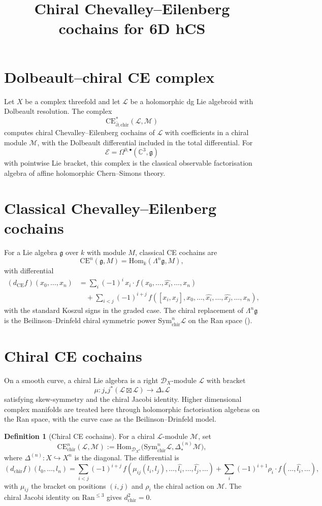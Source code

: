 \documentclass[11pt]{amsart}
\title{Chiral Chevalley--Eilenberg cochains for 6D hCS}
\author{}
\date{}
\providecommand{\C}{\mathbb{C}}
\providecommand{\dbar}{\bar{\partial}}
\providecommand{\g}{\mathfrak{g}}
\providecommand{\Sym}{\mathrm{Sym}}
\providecommand{\CE}{\mathrm{CE}}
\providecommand{\chir}{\mathrm{chir}}
\providecommand{\Ran}{\mathrm{Ran}}
\providecommand{\Hom}{\mathrm{Hom}}
\providecommand{\cL}{\mathcal{L}}
\providecommand{\cM}{\mathcal{M}}
\providecommand{\cE}{\mathcal{E}}
\providecommand{\cD}{\mathcal{D}}
\theoremstyle{plain}
\theoremstyle{definition}
\newtheorem{definition}[theorem]{Definition}
\theoremstyle{remark}
\begin{document}
\maketitle

\section{Dolbeault--chiral CE complex}
Let $X$ be a complex threefold and let $\cL$ be a holomorphic dg Lie
algebroid with Dolbeault resolution. The complex
\[
  \CE^*_{\dbar,\chir}(\cL,\cM)
\]
computes chiral Chevalley--Eilenberg cochains of $\cL$ with coefficients
in a chiral module $\cM$, with the Dolbeault differential included in
the total differential. For
\[
  \cE=\Omega^{0,\bullet}(\C^3,\g)
\]
with pointwise Lie bracket, this complex is the classical observable
factorisation algebra of affine holomorphic Chern--Simons theory.

\section{Classical Chevalley--Eilenberg cochains}
For a Lie algebra $\g$ over $k$ with module $M$, classical CE cochains are
\[
 \CE^n(\g,M)=\Hom_k(\Lambda^n\g,M),
\]
with differential
\[
\begin{aligned}
 (d_{\CE}f)(x_0,\ldots,x_n)
 &=
 \sum_i(-1)^i\,x_i\cdot
 f(x_0,\ldots,\widehat{x_i},\ldots,x_n) \\
 &\quad+
 \sum_{i<j}(-1)^{i+j}\,
 f([x_i,x_j],x_0,\ldots,\widehat{x_i},\ldots,\widehat{x_j},\ldots,x_n),
\end{aligned}
\]
with the standard Koszul signs in the graded case. The chiral
replacement of $\Lambda^n\g$ is the Beilinson--Drinfeld chiral
symmetric power $\Sym^n_{\chir}\cL$ on the Ran space
(\cite[\S3.4]{BD04}).

\section{Chiral CE cochains}
On a smooth curve, a chiral Lie algebra is a right $\cD_X$-module
$\cL$ with bracket
\[
  \mu:j_*j^*(\cL\boxtimes\cL)\longrightarrow\Delta_*\cL
\]
satisfying skew-symmetry and the chiral Jacobi identity. Higher
dimensional complex manifolds are treated here through holomorphic
factorisation algebras on the Ran space, with the curve case as the
Beilinson--Drinfeld model.

\begin{definition}[Chiral CE cochains]
\label{def:chiral-ce-cochains}
For a chiral $\cL$-module $\cM$, set
\[
 \CE^n_{\chir}(\cL,\cM)
 :=
 \Hom_{\cD_{X^n}}\!\bigl(\Sym^n_{\chir}\cL,\Delta^{(n)}_*\cM\bigr),
\]
where $\Delta^{(n)}:X\hookrightarrow X^n$ is the diagonal. The
differential is
\[
 (d_{\chir} f)(l_0,\ldots,l_n)
 =
 \sum_{i<j}(-1)^{i+j}\,
 f(\mu_{ij}(l_i,l_j),\ldots,\widehat{l_i},\ldots,\widehat{l_j},\ldots)
 +
 \sum_i(-1)^{i+1}\rho_i\cdot f(\ldots,\widehat{l_i},\ldots),
\]
with $\mu_{ij}$ the bracket on positions $(i,j)$ and $\rho_i$ the
chiral action on $\cM$. The chiral Jacobi identity on
$\Ran^{\leq3}$ gives $d_{\chir}^2=0$.
\end{definition}
\end{document}
